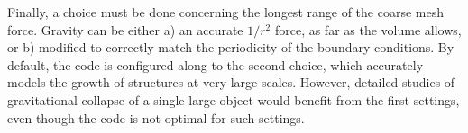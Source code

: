 Finally, a choice must be done concerning the longest range of the coarse mesh force. Gravity can be either a) an accurate $1/r^2$ force, as far as the volume allows, 
or b) modified to correctly match the periodicity of the boundary conditions. By default, the code is configured along to the second choice,
which accurately models the growth of structures at very large scales. However, detailed studies of gravitational collapse of a single large object would benefit 
from the first settings, even though the code is not optimal for such settings.

